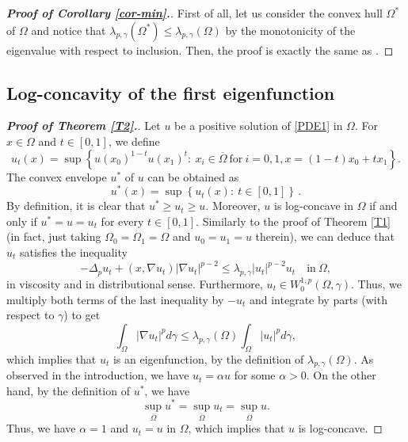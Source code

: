 \documentclass[12pt]{amsart}
\newcommand{\1}{\mathbf 1}
\begin{document}
\begin{proof}[\bf Proof of Corollary \ref{cor-min}.]
{   First of all, let us consider the convex hull $\Omega^*$ of $\Omega$ and notice that $\lambda_{p,\gamma}(\Omega^*)\leq\lambda_{p,\gamma}(\Omega)$ by the monotonicity of the eigenvalue with respect to inclusion. Then, } the proof is exactly the same as  \cite[Corollary 1.5]{Andrea-Paolo2024}.
\end{proof}

\subsection{Log-concavity of the first eigenfunction}

\begin{proof}[\bf Proof of Theorem \ref{T2}.]
Let $u$ be a positive solution of \eqref{PDE1} in $\Omega$. For $x\in \Omega$ and $t\in[0,1]$, we define
\begin{equation}
u_t(x)=\sup \left\{ u(x_0)^{1-t}u(x_1)^t:\ x_i \in \overline{\Omega}\ \text{for}\ i=0,1, x=(1-t)x_0+tx_1\right\}.
\end{equation}
The convex envelope $u^{*}$ of $u$ can be obtained as
\[
u^{*}(x)=\sup \left\{ u_t(x):\ t\in [0,1] \right\}\,.
\]
By definition, it is clear that $u^{*}\geq u_t\geq u$. Moreover, $u$ is log-concave in $\Omega$ if and only if $u^{*}=u=u_t$ for every $t\in[0,1]$. Similarly to the proof of Theorem \ref{T1} (in fact, just taking $\Omega_0=\Omega_1=\Omega$ and $u_0=u_1=u$ therein), we can deduce that  $u_t$ satisfies the inequality
\begin{equation}
-\Delta_p u_t+(x,\nabla u_t)|\nabla u_t|^{p-2}\leq \lambda_{p,\gamma} |u_t|^{p-2}u_t\quad  \mathrm{ in}\ \Omega,
\end{equation}
in viscosity and in distributional sense. Furthermore, $u_t\in W^{1,p}_{0}(\Omega,\gamma)$. Thus, we multiply both terms of the last inequality by $-u_t$ and integrate by parts (with respect to $\gamma$) to get
\[
\int_{\Omega} |\nabla {u}_t|^{p} d\gamma \leq \lambda_{p,\gamma}(\Omega)\int_\Omega|u_t|^pd\gamma,
\]
which implies that $u_t$ is an eigenfunction, by the definition of $ \lambda_{p,\gamma}(\Omega)$. As observed in the introduction, we have
$u_t=\alpha u$ for some $\alpha>0$.
On the other hand, by the definition of $u^{*}$, we have
\[
\mathop{\sup}_{\overline{\Omega}} u^{*}=\mathop{\sup}_{\overline{\Omega}} u_t=\mathop{\sup}_{\overline{\Omega}}u.
\]
Thus, we have $\alpha=1$ and $u_t=u$ in $\Omega$,
which implies that $u$ is log-concave.
\end{proof}
\end{document}
